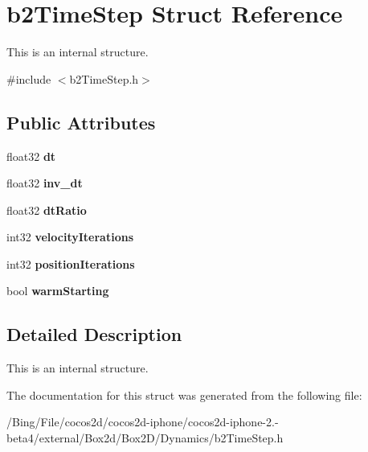\hypertarget{structb2_time_step}{\section{b2\-Time\-Step Struct Reference}
\label{structb2_time_step}
}


This is an internal structure.  




{\ttfamily \#include $<$b2\-Time\-Step.\-h$>$}

\subsection*{Public Attributes}
\begin{DoxyCompactItemize}
\item 
\hypertarget{structb2_time_step_a74e20836809accba98a4445fbcb3427c}{float32 {\bfseries dt}}\label{structb2_time_step_a74e20836809accba98a4445fbcb3427c}

\item 
\hypertarget{structb2_time_step_ac2d652bde6d303149db9d0a461bc22ba}{float32 {\bfseries inv\-\_\-dt}}\label{structb2_time_step_ac2d652bde6d303149db9d0a461bc22ba}

\item 
\hypertarget{structb2_time_step_aa67bc8a12ffafce918d9e6a0d8d3f203}{float32 {\bfseries dt\-Ratio}}\label{structb2_time_step_aa67bc8a12ffafce918d9e6a0d8d3f203}

\item 
\hypertarget{structb2_time_step_a9f2a0ccd8029681f254003b66f201ce1}{int32 {\bfseries velocity\-Iterations}}\label{structb2_time_step_a9f2a0ccd8029681f254003b66f201ce1}

\item 
\hypertarget{structb2_time_step_ab7938eec17a1a3d7961d8364e150f1be}{int32 {\bfseries position\-Iterations}}\label{structb2_time_step_ab7938eec17a1a3d7961d8364e150f1be}

\item 
\hypertarget{structb2_time_step_add80f7f86c84f005ad817f0313df3f32}{bool {\bfseries warm\-Starting}}\label{structb2_time_step_add80f7f86c84f005ad817f0313df3f32}

\end{DoxyCompactItemize}


\subsection{Detailed Description}
This is an internal structure. 

The documentation for this struct was generated from the following file\-:\begin{DoxyCompactItemize}
\item 
/\-Bing/\-File/cocos2d/cocos2d-\/iphone/cocos2d-\/iphone-\/2.-\/beta4/external/\-Box2d/\-Box2\-D/\-Dynamics/b2\-Time\-Step.\-h\end{DoxyCompactItemize}
